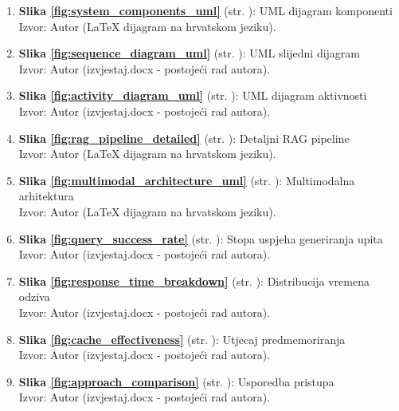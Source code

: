 \begin{enumerate}
\item \textbf{Slika \ref{fig:system_components_uml}} (str. \pageref{fig:system_components_uml}): UML dijagram komponenti \\
Izvor: Autor (LaTeX dijagram na hrvatskom jeziku).

\item \textbf{Slika \ref{fig:sequence_diagram_uml}} (str. \pageref{fig:sequence_diagram_uml}): UML slijedni dijagram \\
Izvor: Autor (izvjestaj.docx - postojeći rad autora).

\item \textbf{Slika \ref{fig:activity_diagram_uml}} (str. \pageref{fig:activity_diagram_uml}): UML dijagram aktivnosti \\
Izvor: Autor (izvjestaj.docx - postojeći rad autora).

\item \textbf{Slika \ref{fig:rag_pipeline_detailed}} (str. \pageref{fig:rag_pipeline_detailed}): Detaljni RAG pipeline \\
Izvor: Autor (LaTeX dijagram na hrvatskom jeziku).

\item \textbf{Slika \ref{fig:multimodal_architecture_uml}} (str. \pageref{fig:multimodal_architecture_uml}): Multimodalna arhitektura \\
Izvor: Autor (LaTeX dijagram na hrvatskom jeziku).

\item \textbf{Slika \ref{fig:query_success_rate}} (str. \pageref{fig:query_success_rate}): Stopa uspjeha generiranja upita \\
Izvor: Autor (izvjestaj.docx - postojeći rad autora).

\item \textbf{Slika \ref{fig:response_time_breakdown}} (str. \pageref{fig:response_time_breakdown}): Distribucija vremena odziva \\
Izvor: Autor (izvjestaj.docx - postojeći rad autora).

\item \textbf{Slika \ref{fig:cache_effectiveness}} (str. \pageref{fig:cache_effectiveness}): Utjecaj predmemoriranja \\
Izvor: Autor (izvjestaj.docx - postojeći rad autora).

\item \textbf{Slika \ref{fig:approach_comparison}} (str. \pageref{fig:approach_comparison}): Usporedba pristupa \\
Izvor: Autor (izvjestaj.docx - postojeći rad autora).


\end{enumerate}
